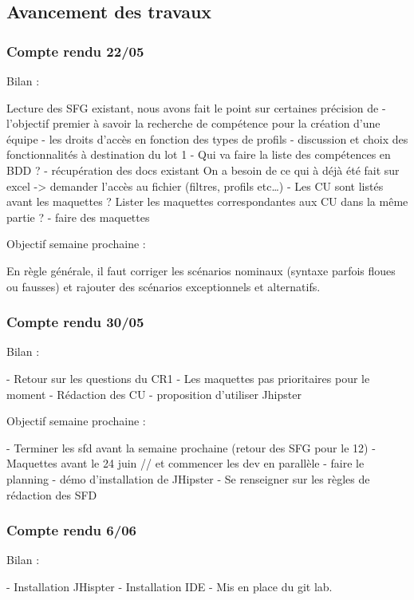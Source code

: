 \subsection{Avancement des travaux}
\subsubsection{Compte rendu 22/05}

Bilan :

Lecture des SFG existant, nous avons fait le point sur certaines précision de
- l’objectif premier à savoir la recherche de compétence pour la création d’une équipe
- les droits d’accès en fonction des types de profils
- discussion et choix des fonctionnalités à destination du lot 1
- Qui va faire la liste des compétences en BDD ?
- récupération des docs existant On a besoin de ce qui à déjà été fait sur excel -> demander l’accès au fichier (filtres, profils etc…)
- Les CU sont listés avant les maquettes ? Lister les maquettes correspondantes aux CU dans la même partie ?
- faire des maquettes 

Objectif semaine prochaine :

En règle générale, il faut corriger les scénarios nominaux (syntaxe parfois floues ou fausses) et rajouter des scénarios exceptionnels et alternatifs.

\subsubsection{Compte rendu 30/05}

Bilan :

- Retour sur les questions du CR1
- Les maquettes pas prioritaires pour le moment
- Rédaction des CU
- proposition d'utiliser Jhipster

Objectif semaine prochaine :

- Terminer les sfd avant la semaine prochaine (retour des SFG pour le 12)
- Maquettes avant le 24 juin // et commencer les dev en parallèle 
- faire le planning
- démo d’installation de JHipster
- Se renseigner sur les règles de rédaction des SFD

\subsubsection{Compte rendu 6/06}

Bilan :

- Installation JHispter
- Installation IDE
- Mis en place du git lab. 

